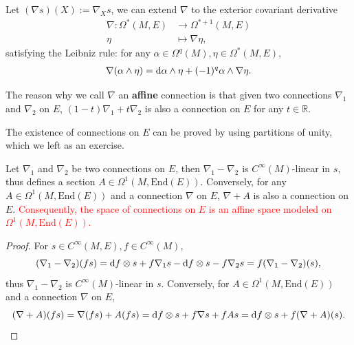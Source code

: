 Let $(\nabla s)(X):= \nabla_X s$, we can extend $\nabla$ to the exterior covariant derivative
\begin{align*}
    \nabla: \Omega^*(M,E) &\to \Omega^{*+1}(M,E) \\
    \eta &\mapsto \nabla \eta,
\end{align*}
satisfying the Leibniz rule: for any $\alpha\in \Omega^q(M),\eta\in \Omega^*(M,E)$,
\begin{align*}
    \nabla(\alpha\wedge\eta) = {\rm d}\alpha\wedge\eta + (-1)^{q}\alpha\wedge \nabla\eta.
\end{align*}

\begin{remark}
    The reason why we call $\nabla$ an \textbf{affine} connection is that given two connections $\nabla_1$ and $\nabla_2$ on $E$, 
    $(1-t)\nabla_1 + t\nabla_2$ is also a connection on $E$ for any $t\in \mathbb{R}$.
\end{remark}

\begin{remark}
    The existence of connections on $E$ can be proved by using partitions of unity, which we left as an exercise.
\end{remark}

\begin{proposition}
    Let $\nabla_1$ and $\nabla_2$ be two connections on $E$, then $\nabla_1 - \nabla_2$ is $C^\infty(M)$-linear in $s$, 
    thus defines a section $A\in \Omega^1(M,\mathrm{End}(E))$. 
    Conversely, for any $A\in \Omega^1(M,\mathrm{End}(E))$ and a connection $\nabla$ on $E$, $\nabla + A$ is also a connection on $E$. 
    \textcolor{red}{Consequently, the space of connections on $E$ is an affine space modeled on $\Omega^1(M,\mathrm{End}(E))$.}
\end{proposition}
\begin{proof}
    For $s\in C^\infty(M,E),f\in C^\infty(M)$, 
    \begin{equation*}
        (\nabla_1 - \nabla_2)(fs) = {\rm d} f\otimes s + f\nabla_1 s - {\rm d} f\otimes s - f\nabla_2 s = f(\nabla_1 - \nabla_2)(s),
    \end{equation*}
    thus $\nabla_1 - \nabla_2$ is $C^\infty(M)$-linear in $s$. 
    Conversely, for $A\in \Omega^1(M,\mathrm{End}(E))$ and a connection $\nabla$ on $E$,
    \begin{equation*}
        (\nabla + A)(fs) = \nabla(fs) + A(fs) = {\rm d} f\otimes s + f\nabla s + fAs = {\rm d} f\otimes s + f(\nabla + A)(s). \qedhere
    \end{equation*}
\end{proof}

